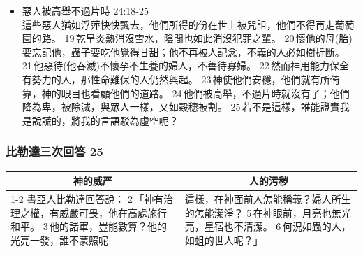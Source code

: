 \begin{itemize}
\begin{itemize}
\item 惡人被高舉不過片時 24:18-25\\
這些惡人猶如浮萍快快飄去，他們所得的份在世上被咒詛，他們不得再走葡萄園的路。 19 乾旱炎熱消沒雪水，陰間也如此消沒犯罪之輩。 20 懷他的母(胎)要忘記他，蟲子要吃他覺得甘甜；他不再被人記念，不義的人必如樹折斷。 21 他惡待(他吞滅)不懷孕不生養的婦人，不善待寡婦。 22 然而神用能力保全有勢力的人，那性命難保的人仍然興起。 23 神使他們安穩，他們就有所倚靠，神的眼目也看顧他們的道路。 24 他們被高舉，不過片時就沒有了；他們降為卑，被除滅，與眾人一樣，又如穀穗被割。 25 若不是這樣，誰能證實我是說謊的，將我的言語駁為虛空呢？
\end{itemize}
\end{itemize}


\subsubsection{比勒達三次回答 25}
\begin{table}[H]
\centering 
\begin{tabular}{p{}|p{}}    \toprule 
\multicolumn{1}{c|}{神的威严}& \multicolumn{1}{c}{人的污秽}\\\cline{1-2}
書亞人比勒達回答說： 2 「神有治理之權，有威嚴可畏，他在高處施行和平。 3 他的諸軍，豈能數算？他的光亮一發，誰不蒙照呢
&這樣，在神面前人怎能稱義？婦人所生的怎能潔淨？ 5 在神眼前，月亮也無光亮，星宿也不清潔。 6 何況如蟲的人，如蛆的世人呢？」\\ \bottomrule
\end{tabular} 
\end{table}


